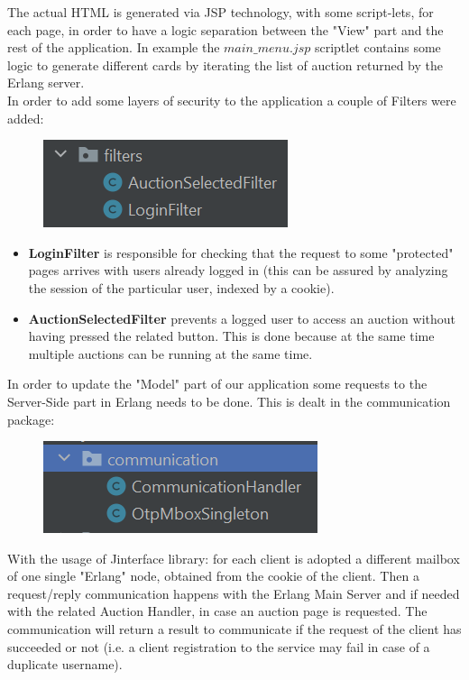 The actual HTML is generated via JSP technology, with some script-lets, for each page, in order to have a logic separation between the "View" part and the rest of the application. In example the $main\_menu.jsp$ scriptlet contains some logic to generate different cards by iterating the list of auction returned by the Erlang server.\\

In order to add some layers of security to the application a couple of Filters were added:\\
\begin{figure}[H]
	\centering
	\includegraphics[width=0.4\linewidth]{img/filters}
	\caption{}
	\label{fig:filters}
\end{figure}
\begin{itemize}
	\item \textbf{LoginFilter} is responsible for checking that the request to some "protected" pages arrives with users already logged in (this can be assured by analyzing the session of the particular user, indexed by a cookie).
		
	\item \textbf{AuctionSelectedFilter} prevents a logged user to access an auction without having pressed the related button. This is done because at the same time multiple auctions can be running at the same time.\\
	
\end{itemize}
In order to update the "Model" part of our application some requests to the Server-Side part in Erlang needs to be done. This is dealt in the communication package:

\begin{figure}[H]
	\centering
	\includegraphics[width=0.4\linewidth]{img/communication}
	\caption{}
	\label{fig:communication}
\end{figure}

With the usage of Jinterface library: for each client is adopted a different mailbox of one single "Erlang" node, obtained from the cookie of the client. Then a request/reply communication happens with the Erlang Main Server and if needed with the related Auction Handler, in case an auction page is requested. The communication will return a result to communicate if the request of the client has succeeded or not (i.e. a client registration to the service may fail in case of a duplicate username).
